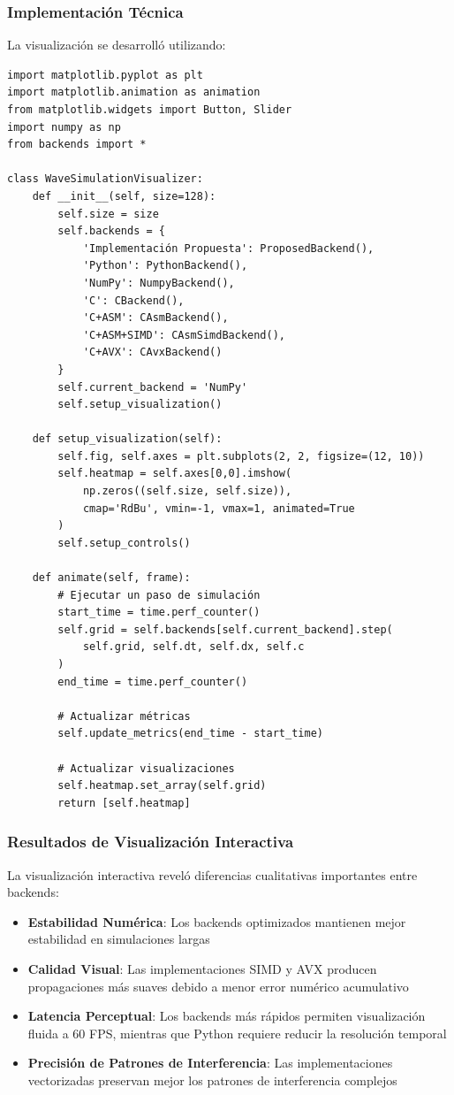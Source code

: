 \documentclass[a4paper]{article}
\begin{document}
\subsubsection{Implementación Técnica}

La visualización se desarrolló utilizando:

\begin{verbatim}
import matplotlib.pyplot as plt
import matplotlib.animation as animation
from matplotlib.widgets import Button, Slider
import numpy as np
from backends import *

class WaveSimulationVisualizer:
    def __init__(self, size=128):
        self.size = size
        self.backends = {
            'Implementación Propuesta': ProposedBackend(),
            'Python': PythonBackend(),
            'NumPy': NumpyBackend(), 
            'C': CBackend(),
            'C+ASM': CAsmBackend(),
            'C+ASM+SIMD': CAsmSimdBackend(),
            'C+AVX': CAvxBackend()
        }
        self.current_backend = 'NumPy'
        self.setup_visualization()
    
    def setup_visualization(self):
        self.fig, self.axes = plt.subplots(2, 2, figsize=(12, 10))
        self.heatmap = self.axes[0,0].imshow(
            np.zeros((self.size, self.size)), 
            cmap='RdBu', vmin=-1, vmax=1, animated=True
        )
        self.setup_controls()
        
    def animate(self, frame):
        # Ejecutar un paso de simulación
        start_time = time.perf_counter()
        self.grid = self.backends[self.current_backend].step(
            self.grid, self.dt, self.dx, self.c
        )
        end_time = time.perf_counter()
        
        # Actualizar métricas
        self.update_metrics(end_time - start_time)
        
        # Actualizar visualizaciones
        self.heatmap.set_array(self.grid)
        return [self.heatmap]
\end{verbatim}

\subsubsection{Resultados de Visualización Interactiva}

La visualización interactiva reveló diferencias cualitativas importantes entre backends:

\begin{itemize}
    \item \textbf{Estabilidad Numérica}: Los backends optimizados mantienen mejor estabilidad en simulaciones largas
    \item \textbf{Calidad Visual}: Las implementaciones SIMD y AVX producen propagaciones más suaves debido a menor error numérico acumulativo
    \item \textbf{Latencia Perceptual}: Los backends más rápidos permiten visualización fluida a 60 FPS, mientras que Python requiere reducir la resolución temporal
    \item \textbf{Precisión de Patrones de Interferencia}: Las implementaciones vectorizadas preservan mejor los patrones de interferencia complejos
\end{itemize}
\end{document}
